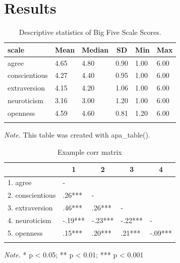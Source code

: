 \documentclass[
  man,floatsintext]{apa6}
\begin{document}
\hypertarget{results}{%
\section{Results}\label{results}}

\begin{table}[tbp]
\begin{center}
\begin{threeparttable}
\caption{\label{tab:descrips-tab}Descriptive statistics of Big Five Scale Scores.}
\begin{tabular}{llllll}
\toprule
scale & \multicolumn{1}{c}{Mean} & \multicolumn{1}{c}{Median} & \multicolumn{1}{c}{SD} & \multicolumn{1}{c}{Min} & \multicolumn{1}{c}{Max}\\
\midrule
agree & 4.65 & 4.80 & 0.90 & 1.00 & 6.00\\
conscientious & 4.27 & 4.40 & 0.95 & 1.00 & 6.00\\
extraversion & 4.15 & 4.20 & 1.06 & 1.00 & 6.00\\
neuroticism & 3.16 & 3.00 & 1.20 & 1.00 & 6.00\\
openness & 4.59 & 4.60 & 0.81 & 1.20 & 6.00\\
\bottomrule
\addlinespace
\end{tabular}
\begin{tablenotes}[para]
\normalsize{\textit{Note.} This table was created with apa\_table().}
\end{tablenotes}
\end{threeparttable}
\end{center}
\end{table}

\begin{table}[tbp]
\begin{center}
\begin{threeparttable}
\caption{\label{tab:scale-intercors-tbl}Example corr matrix}
\begin{tabular}{lllll}
\toprule
 & \multicolumn{1}{c}{1} & \multicolumn{1}{c}{2} & \multicolumn{1}{c}{3} & \multicolumn{1}{c}{4}\\
\midrule
1. agree & - &  &  & \\
2. conscientious & .26*** & - &  & \\
3. extraversion & .46*** & .26*** & - & \\
4. neuroticism & -.19*** & -.23*** & -.22*** & -\\
5. openness & .15*** & .20*** & .21*** & -.09***\\
\bottomrule
\addlinespace
\end{tabular}
\begin{tablenotes}[para]
\normalsize{\textit{Note.} * p < 0.05; ** p < 0.01; *** p < 0.001}
\end{tablenotes}
\end{threeparttable}
\end{center}
\end{table}
\end{document}
